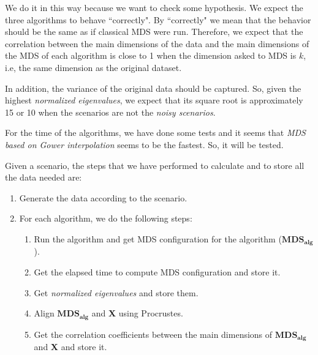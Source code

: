 \documentclass[11pt]{report}
\begin{document}
\indent We do it in this way because we want to check some hypothesis. We 
expect the three algorithms to behave ``correctly". By ``correctly" we mean 
that the behavior should be the same as if classical MDS were run. Therefore, 
we expect that the correlation between the main dimensions of the data and the
main dimensions of the MDS of each algorithm is close to 1 when the
dimension asked to MDS is $k$, i.e, the same dimension as the original dataset.

\indent In addition, the variance of the original data should be captured. 
So, given the highest \textit{normalized eigenvalues}, we expect that 
its square root is approximately 15 or 10 when the scenarios are not the 
\textit{noisy scenarios}. 

\indent For the time of the algorithms, we have done some tests and it seems 
that \textit{MDS based on Gower interpolation} seems to be the fastest.
So, it will be tested.


\indent Given a scenario, the steps that we have performed to calculate  and to
store all the data needed are:

\begin{enumerate}

\item Generate the data according to the scenario. 

\item For each algorithm, we do the following steps:

\begin{enumerate}

\item Run the algorithm and get MDS configuration for the algorithm
($\mathbf{MDS_{alg}}$).

\item Get the elapsed time to compute MDS configuration and store it.

\item Get \textit{normalized eigenvalues} and store them.

\item Align $\mathbf{MDS_{alg}}$ and \textbf{X} using Procrustes.

\item Get the correlation coefficients between the main dimensions of 
$\mathbf{MDS_{alg}}$ and \textbf{X} and store it.

\end{enumerate}

\end{enumerate}
\end{document}
